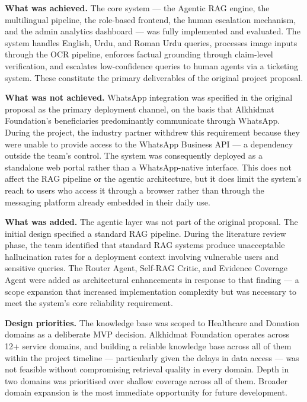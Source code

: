 \textbf{What was achieved.} The core system — the Agentic RAG engine, the 
multilingual pipeline, the role-based frontend, the human escalation 
mechanism, and the admin analytics dashboard — was fully implemented and 
evaluated. The system handles English, Urdu, and Roman Urdu queries, processes 
image inputs through the OCR pipeline, enforces factual grounding through 
claim-level verification, and escalates low-confidence queries to human agents 
via a ticketing system. These constitute the primary deliverables of the 
original project proposal.

\textbf{What was not achieved.} WhatsApp integration was specified in the 
original proposal as the primary deployment channel, on the basis that 
Alkhidmat Foundation's beneficiaries predominantly communicate through 
WhatsApp. During the project, the industry partner withdrew this requirement 
because they were unable to provide access to the WhatsApp Business API — a 
dependency outside the team's control. The system was consequently deployed as 
a standalone web portal rather than a WhatsApp-native interface. This does not 
affect the RAG pipeline or the agentic architecture, but it does limit the 
system's reach to users who access it through a browser rather than through 
the messaging platform already embedded in their daily use.

\textbf{What was added.} The agentic layer was not part of the original 
proposal. The initial design specified a standard RAG pipeline. During the 
literature review phase, the team identified that standard RAG systems produce 
unacceptable hallucination rates for a deployment context involving vulnerable 
users and sensitive queries. The Router Agent, Self-RAG Critic, and Evidence 
Coverage Agent were added as architectural enhancements in response to that 
finding — a scope expansion that increased implementation complexity but was 
necessary to meet the system's core reliability requirement.

\textbf{Design priorities.} The knowledge base was scoped to Healthcare and 
Donation domains as a deliberate MVP decision. Alkhidmat Foundation operates 
across 12+ service domains, and building a reliable knowledge base across all 
of them within the project timeline — particularly given the delays in data 
access — was not feasible without compromising retrieval quality in every 
domain. Depth in two domains was prioritised over shallow coverage across all 
of them. Broader domain expansion is the most immediate opportunity for future 
development.